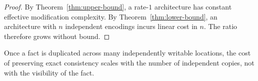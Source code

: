 \begin{proof}
By Theorem~\ref{thm:upper-bound}, a rate-$1$ architecture has constant effective modification complexity. By Theorem~\ref{thm:lower-bound}, an architecture with $n$ independent encodings incurs linear cost in $n$. The ratio therefore grows without bound.
\end{proof}

Once a fact is duplicated across many independently writable locations, the cost of preserving exact consistency scales with the number of independent copies, not with the visibility of the fact.
